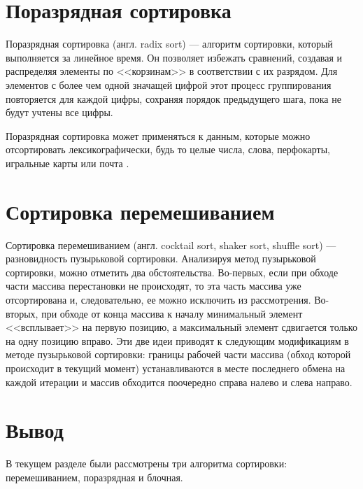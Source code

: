 \section{Поразрядная сортировка}

Поразрядная сортировка (англ. radix sort) --- алгоритм сортировки, который выполняется за линейное время. 
Он позволяет избежать сравнений, создавая и распределяя элементы по <<корзинам>> в соответствии с их разрядом. 
Для элементов с более чем одной значащей цифрой этот процесс группирования повторяется для каждой цифры, сохраняя порядок предыдущего шага, пока не будут учтены все цифры.

Поразрядная сортировка может применяться к данным, которые можно отсортировать лексикографически, будь то целые числа, слова, перфокарты, игральные карты или почта \cite{Sinha2003}.

\section{Сортировка перемешиванием}

Сортировка перемешиванием (англ. cocktail sort, shaker sort, shuffle sort) --- разновидность пузырьковой сортировки. 
Анализируя метод пузырьковой сортировки, можно отметить два обстоятельства. 
Во-первых, если при обходе части массива перестановки не происходят, то эта часть массива уже отсортирована и, следовательно, ее можно исключить из рассмотрения. 
Во-вторых, при обходе от конца массива к началу минимальный элемент <<всплывает>> на первую позицию, а максимальный элемент сдвигается только на одну позицию вправо. 
Эти две идеи приводят к следующим модификациям в методе пузырьковой сортировки: границы рабочей части массива (обход которой происходит в текущий момент) устанавливаются в месте последнего обмена на каждой итерации и массив обходится поочередно справа налево и слева направо.

\section*{Вывод}

В текущем разделе были рассмотрены три алгоритма сортировки: перемешиванием, поразрядная и блочная.
